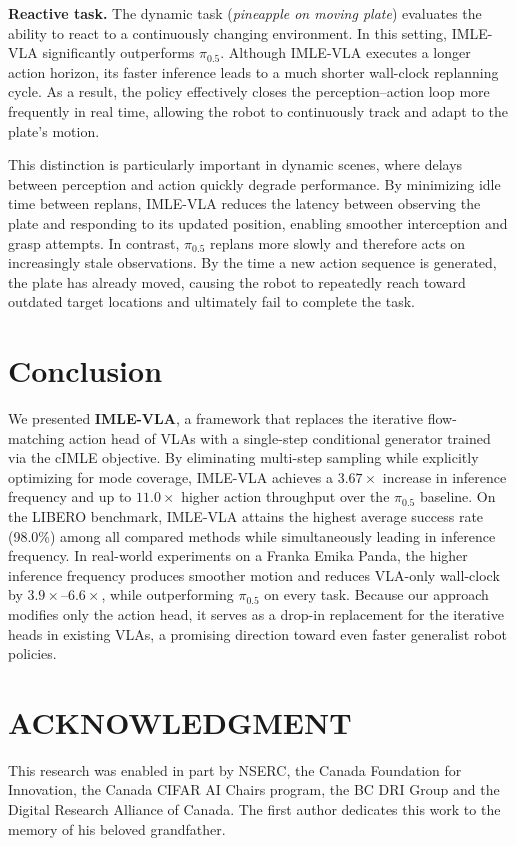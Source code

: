 \documentclass[letterpaper, 10 pt, conference]{ieeeconf}  %
\begin{document}
\textbf{Reactive task.} The dynamic task (\emph{pineapple on moving plate}) evaluates the ability to react to a continuously changing environment. In this setting, IMLE-VLA significantly outperforms $\pi_{0.5}$. Although IMLE-VLA executes a longer action horizon, its faster inference leads to a much shorter wall-clock replanning cycle. As a result, the policy effectively closes the perception--action loop more frequently in real time, allowing the robot to continuously track and adapt to the plate's motion.

This distinction is particularly important in dynamic scenes, where delays between perception and action quickly degrade performance. By minimizing idle time between replans, IMLE-VLA reduces the latency between observing the plate and responding to its updated position, enabling smoother interception and grasp attempts. In contrast, $\pi_{0.5}$ replans more slowly and therefore acts on increasingly stale observations. By the time a new action sequence is generated, the plate has already moved, causing the robot to repeatedly reach toward outdated target locations and ultimately fail to complete the task.


\section{Conclusion}
\label{sec:conclusion}

We presented \textbf{IMLE-VLA}, a framework that replaces the iterative flow-matching action head of VLAs with a single-step conditional generator trained via the cIMLE objective. By eliminating multi-step sampling while explicitly optimizing for mode coverage, IMLE-VLA achieves a $3.67\times$ increase in inference frequency and up to $11.0\times$ higher action throughput over the $\pi_{0.5}$ baseline. On the LIBERO benchmark, IMLE-VLA attains the highest average success rate (98.0\%) among all compared methods while simultaneously leading in inference frequency. In real-world experiments on a Franka Emika Panda, the higher inference frequency produces smoother motion and reduces VLA-only wall-clock by $3.9\times$--$6.6\times$, while outperforming $\pi_{0.5}$ on every task. Because our approach modifies only the action head, it serves as a drop-in replacement for the iterative heads in existing VLAs, a promising direction toward even faster generalist robot policies.

\section*{ACKNOWLEDGMENT}

This research was enabled in part by NSERC, the Canada Foundation for Innovation, the Canada CIFAR AI Chairs program, the BC DRI Group and the Digital Research Alliance of Canada. The first author dedicates this work to the memory of his beloved grandfather.



\end{document}
